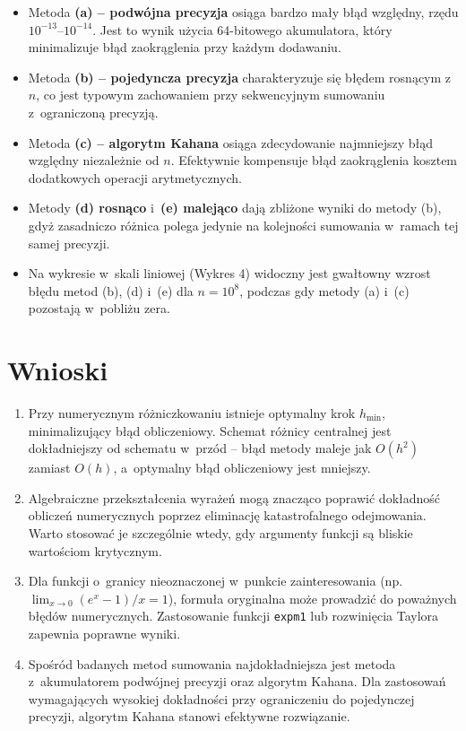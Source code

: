 \documentclass[12pt, a4paper]{article}
\begin{document}
\begin{itemize}
  \item Metoda \textbf{(a) -- podwójna precyzja} osiąga bardzo mały błąd względny, rzędu $10^{-13}$–$10^{-14}$. Jest to wynik użycia 64-bitowego akumulatora, który minimalizuje błąd zaokrąglenia przy każdym dodawaniu.
  \item Metoda \textbf{(b) -- pojedyncza precyzja} charakteryzuje się błędem rosnącym z~$n$, co jest typowym zachowaniem przy sekwencyjnym sumowaniu z~ograniczoną precyzją.
  \item Metoda \textbf{(c) -- algorytm Kahana} osiąga zdecydowanie najmniejszy błąd względny niezależnie od $n$. Efektywnie kompensuje błąd zaokrąglenia kosztem dodatkowych operacji arytmetycznych.
  \item Metody \textbf{(d) rosnąco} i~\textbf{(e) malejąco} dają zbliżone wyniki do metody (b), gdyż zasadniczo różnica polega jedynie na kolejności sumowania w~ramach tej samej precyzji.
  \item Na wykresie w~skali liniowej (Wykres 4) widoczny jest gwałtowny wzrost błędu metod (b), (d) i~(e) dla $n = 10^8$, podczas gdy metody (a) i~(c) pozostają w~pobliżu zera.
\end{itemize}

\section{Wnioski}

\begin{enumerate}
  \item Przy numerycznym różniczkowaniu istnieje optymalny krok $h_{\min}$, minimalizujący błąd obliczeniowy. Schemat różnicy centralnej jest dokładniejszy od schematu w~przód -- błąd metody maleje jak $O(h^2)$ zamiast $O(h)$, a~optymalny błąd obliczeniowy jest mniejszy.

  \item Algebraiczne przekształcenia wyrażeń mogą znacząco poprawić dokładność obliczeń numerycznych poprzez eliminację katastrofalnego odejmowania. Warto stosować je szczególnie wtedy, gdy argumenty funkcji są bliskie wartościom krytycznym.

  \item Dla funkcji o~granicy nieoznaczonej w~punkcie zainteresowania (np. $\lim_{x\to 0}(e^x-1)/x = 1$), formuła oryginalna może prowadzić do poważnych błędów numerycznych. Zastosowanie funkcji \texttt{expm1} lub rozwinięcia Taylora zapewnia poprawne wyniki.

  \item Spośród badanych metod sumowania najdokładniejsza jest metoda z~akumulatorem podwójnej precyzji oraz algorytm Kahana. Dla zastosowań wymagających wysokiej dokładności przy ograniczeniu do pojedynczej precyzji, algorytm Kahana stanowi efektywne rozwiązanie.
\end{enumerate}
\end{document}
